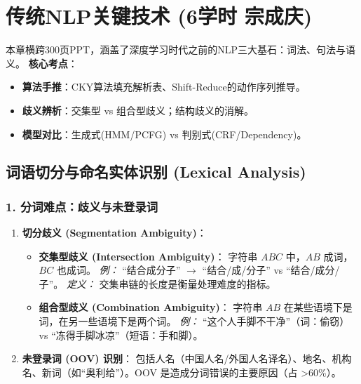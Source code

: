 \documentclass[a4paper, 11pt]{ctexart}
\begin{document}
\section{传统NLP关键技术 \small{(6学时 宗成庆)}}

\begin{note}[章节导读]
本章横跨300页PPT，涵盖了深度学习时代之前的NLP三大基石：词法、句法与语义。
\textbf{核心考点}：
\begin{itemize}
    \item \textbf{算法手推}：CKY算法填充解析表、Shift-Reduce的动作序列推导。
    \item \textbf{歧义辨析}：交集型 vs 组合型歧义；结构歧义的消解。
    \item \textbf{模型对比}：生成式(HMM/PCFG) vs 判别式(CRF/Dependency)。
\end{itemize}
\end{note}

\subsection{词语切分与命名实体识别 (Lexical Analysis)}

\subsubsection{1. 分词难点：歧义与未登录词}
\begin{enumerate}
    \item \textbf{切分歧义 (Segmentation Ambiguity)}：
    \begin{itemize}
        \item \textbf{交集型歧义 (Intersection Ambiguity)}：
        字符串 $ABC$ 中，$AB$ 成词，$BC$ 也成词。
        \textit{例：} “结合成分子” $\to$ “结合/成/分子” vs “结合/成分/子”。
        \textit{定义：} 交集串链的长度是衡量处理难度的指标。
        \item \textbf{组合型歧义 (Combination Ambiguity)}：
        字符串 $AB$ 在某些语境下是词，在另一些语境下是两个词。
        \textit{例：} “这个人手脚不干净”（词：偷窃） vs “冻得手脚冰凉”（短语：手和脚）。
    \end{itemize}
    \item \textbf{未登录词 (OOV) 识别}：
    包括人名（中国人名/外国人名译名）、地名、机构名、新词（如“奥利给”）。OOV 是造成分词错误的主要原因（占 >60\%）。
\end{enumerate}
\end{document}
